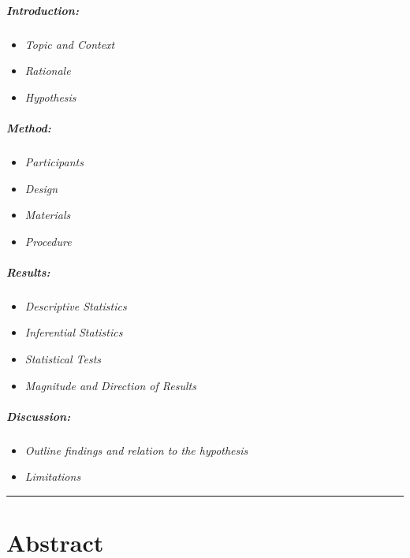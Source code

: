 \documentclass[
]{article}
\providecommand{\tightlist}{%
  \setlength{\itemsep}{0pt}\setlength{\parskip}{0pt}}
\begin{document}
\hypertarget{introduction}{%
\subparagraph{\texorpdfstring{\emph{Introduction:}}{Introduction:}}\label{introduction}}

\begin{itemize}
\tightlist
\item
  \emph{Topic and Context}
\item
  \emph{Rationale}
\item
  \emph{Hypothesis}
\end{itemize}

\hypertarget{method}{%
\subparagraph{\texorpdfstring{\emph{Method:}}{Method:}}\label{method}}

\begin{itemize}
\tightlist
\item
  \emph{Participants}
\item
  \emph{Design}
\item
  \emph{Materials}
\item
  \emph{Procedure}
\end{itemize}

\hypertarget{results}{%
\subparagraph{\texorpdfstring{\emph{Results:}}{Results:}}\label{results}}

\begin{itemize}
\tightlist
\item
  \emph{Descriptive Statistics}
\item
  \emph{Inferential Statistics}
\item
  \emph{Statistical Tests}
\item
  \emph{Magnitude and Direction of Results}
\end{itemize}

\hypertarget{discussion}{%
\subparagraph{\texorpdfstring{\emph{Discussion:}}{Discussion:}}\label{discussion}}

\begin{itemize}
\tightlist
\item
  \emph{Outline findings and relation to the hypothesis}
\item
  \emph{Limitations}
\end{itemize}

\begin{center}\rule{0.5\linewidth}{0.5pt}\end{center}

\hypertarget{abstract-1}{%
\section{Abstract}\label{abstract-1}}
\end{document}
